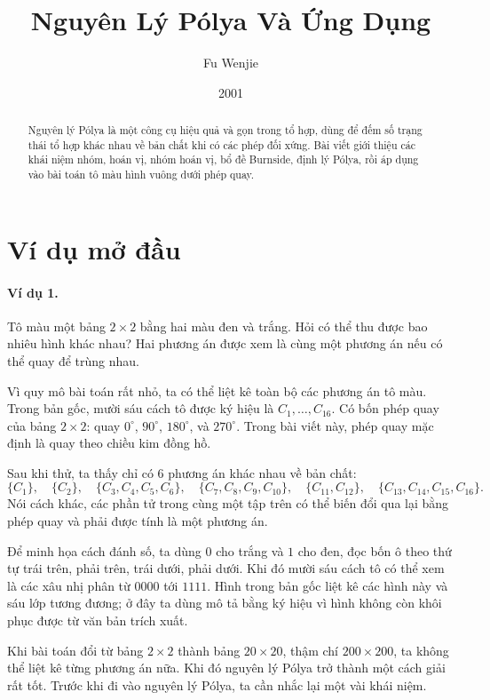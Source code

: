 \documentclass[11pt]{article}
\title{Nguyên Lý Pólya Và Ứng Dụng}
\author{Fu Wenjie}
\date{2001}
\begin{document}
\maketitle


\begin{abstract}
Nguyên lý Pólya là một công cụ hiệu quả và gọn trong tổ hợp, dùng để đếm số
trạng thái tổ hợp khác nhau về bản chất khi có các phép đối xứng. Bài viết
giới thiệu các khái niệm nhóm, hoán vị, nhóm hoán vị, bổ đề Burnside, định lý
Pólya, rồi áp dụng vào bài toán tô màu hình vuông dưới phép quay.
\end{abstract}

\section{Ví dụ mở đầu}

\paragraph{Ví dụ 1.}
Tô màu một bảng \(2\times2\) bằng hai màu đen và trắng. Hỏi có thể thu được
bao nhiêu hình khác nhau? Hai phương án được xem là cùng một phương án nếu có
thể quay để trùng nhau.

Vì quy mô bài toán rất nhỏ, ta có thể liệt kê toàn bộ các phương án tô màu.
Trong bản gốc, mười sáu cách tô được ký hiệu là \(C_1,\ldots,C_{16}\). Có
bốn phép quay của bảng \(2\times2\): quay \(0^\circ\), \(90^\circ\),
\(180^\circ\), và \(270^\circ\). Trong bài viết này, phép quay mặc định là
quay theo chiều kim đồng hồ.

Sau khi thử, ta thấy chỉ có \(6\) phương án khác nhau về bản chất:
\[
  \{C_1\},\quad \{C_2\},\quad
  \{C_3,C_4,C_5,C_6\},\quad
  \{C_7,C_8,C_9,C_{10}\},\quad
  \{C_{11},C_{12}\},\quad
  \{C_{13},C_{14},C_{15},C_{16}\}.
\]
Nói cách khác, các phần tử trong cùng một tập trên có thể biến đổi qua lại
bằng phép quay và phải được tính là một phương án.

Để minh họa cách đánh số, ta dùng \(0\) cho trắng và \(1\) cho đen, đọc bốn ô
theo thứ tự trái trên, phải trên, trái dưới, phải dưới. Khi đó mười sáu cách
tô có thể xem là các xâu nhị phân từ \(0000\) tới \(1111\). Hình trong bản
gốc liệt kê các hình này và sáu lớp tương đương; ở đây ta dùng mô tả bằng ký
hiệu vì hình không còn khôi phục được từ văn bản trích xuất.

Khi bài toán đổi từ bảng \(2\times2\) thành bảng \(20\times20\), thậm chí
\(200\times200\), ta không thể liệt kê từng phương án nữa. Khi đó nguyên lý
Pólya trở thành một cách giải rất tốt. Trước khi đi vào nguyên lý Pólya, ta
cần nhắc lại một vài khái niệm.
\end{document}
